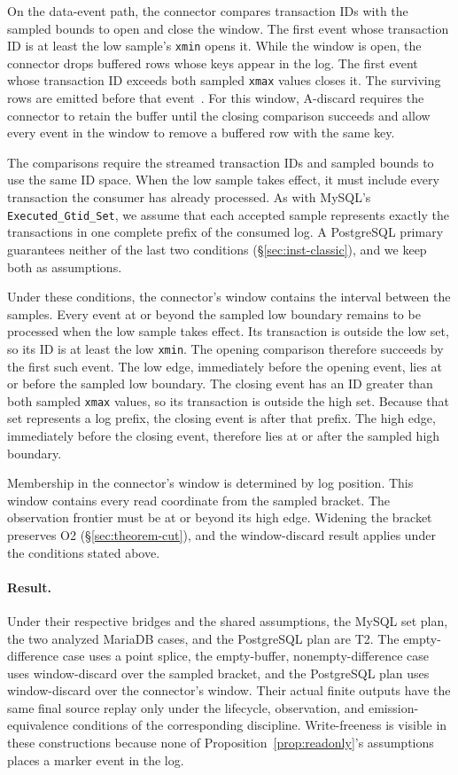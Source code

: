 \documentclass[sigconf,nonacm,10pt]{acmart}
\theoremstyle{plain}
\theoremstyle{definition}
\begin{document}
On the data-event path, the connector compares transaction IDs with the
sampled bounds to open and close the window. The first event whose
transaction ID is at least the low sample's \texttt{xmin} opens it. While
the window is open, the connector drops buffered rows whose keys appear
in the log. The first event whose transaction ID exceeds both sampled
\texttt{xmax} values closes it. The surviving rows are emitted before
that event~\cite{debezium_postgres_readonly_source,debezium_signal_delete_source}.
For this window, A-discard requires the connector to retain the buffer
until the closing comparison succeeds and allow every event in the
window to remove a buffered row with the same key.

The comparisons require the streamed transaction IDs and sampled bounds
to use the same ID space. When the low sample takes effect, it
must include every transaction the consumer has already processed. As
with MySQL's \texttt{Executed\_Gtid\_Set}, we assume that each accepted
sample represents exactly the transactions in one complete prefix of the
consumed log. A PostgreSQL primary guarantees neither of the last two
conditions (\S\ref{sec:inst-classic}), and we keep both as assumptions.

Under these conditions, the connector's window contains the interval
between the samples. Every event at or beyond the sampled low boundary
remains to be processed when the low sample takes effect. Its transaction
is outside the low set, so its ID is at least the low \texttt{xmin}. The
opening comparison therefore succeeds by the first such event. The low
edge, immediately before the opening event, lies at or before the
sampled low boundary. The closing event has an ID greater than both
sampled \texttt{xmax} values, so its transaction is outside the high set.
Because that set represents a log prefix, the closing event is after
that prefix. The high edge, immediately before the closing event,
therefore lies at or after the sampled high boundary.

Membership in the connector's window is determined by log position. This
window contains every read coordinate from the sampled bracket. The
observation frontier must be at or beyond its high edge. Widening the
bracket preserves O2 (\S\ref{sec:theorem-cut}), and the
window-discard result applies under the conditions stated above.

\paragraph{Result.}
Under their respective bridges and the shared assumptions, the
MySQL set plan, the two analyzed MariaDB cases, and the PostgreSQL plan are T2.
The empty-difference case uses a point splice, the empty-buffer,
nonempty-difference case uses window-discard over the sampled bracket,
and the PostgreSQL plan uses window-discard over the connector's window.
Their actual finite outputs have the same final source replay only under
the lifecycle, observation, and emission-equivalence conditions of the
corresponding discipline. Write-freeness is visible in these
constructions because none of Proposition~\ref{prop:readonly}'s assumptions places a marker event in the log.
\end{document}
